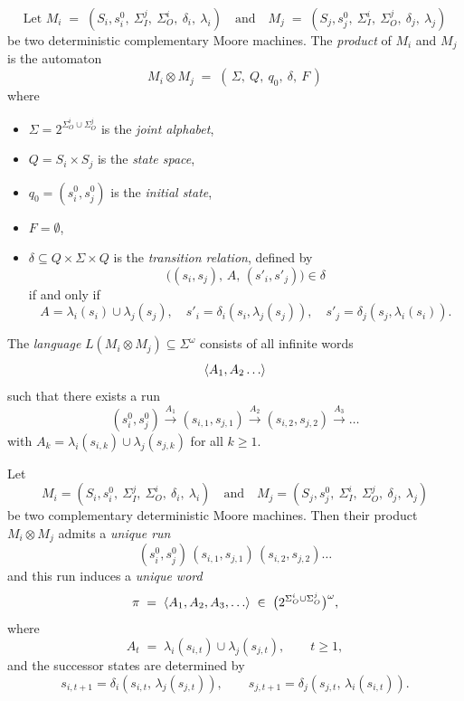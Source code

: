   
  \begin{definition}
  
  \[\text{Let }
  M_i \;=\; (S_i, s^0_i,\ \Sigma_I^j,\ \Sigma_O^i,\ \delta_i,\ \lambda_i)
  \quad\text{and}\quad
  M_j \;=\; (S_j, s^0_j,\ \Sigma_I^i,\ \Sigma_O^j,\ \delta_j,\ \lambda_j)
  \]
  be two deterministic complementary Moore machines.
  The \emph{product} of $M_i$ and $M_j$ is the automaton
  \[
  M_i \otimes M_j \;=\; (\,\Sigma,\ Q,\ q_0,\ \delta,\ F\,)
  \]
  where
  \begin{itemize}
      \item $\Sigma = 2^{\Sigma_O^i \cup \Sigma_O^j}$ is the \emph{joint alphabet},
      \item $Q = S_i \times S_j$ is the \emph{state space},
      \item $q_0 = (s^0_i, s^0_j)$ is the \emph{initial state},
      \item $F = \emptyset$,
      \item $\delta \subseteq Q \times \Sigma \times Q$ is the \emph{transition relation}, defined by
      \[
      \big((s_i,s_j),\, A,\, (s'_i,s'_j)\big) \in \delta
      \]
      if and only if
      \[
      A = \lambda_i(s_i) \cup \lambda_j(s_j), 
      \quad s'_i = \delta_i(s_i,\lambda_j(s_j)), 
      \quad s'_j = \delta_j(s_j,\lambda_i(s_i)).
      \]
  \end{itemize}
  The \emph{language} $L(M_i \otimes M_j) \subseteq \Sigma^\omega$ consists of all infinite words
  \[
  \trace{A_1, A_2 \dots}
  \]
  such that there exists a run
  \[
  (s^0_i, s^0_j) \xrightarrow{A_1} (s_{i,1}, s_{j,1}) \xrightarrow{A_2} (s_{i,2}, s_{j,2}) \xrightarrow{A_3} \dots
  \]
  with $A_k = \lambda_i(s_{i,k}) \cup \lambda_j(s_{j,k})$ for all $k \geq 1$.
  \end{definition}
  
  
  
  \begin{lemma}
  \label{lem:product-word}
  Let
  \[
  M_i = (S_i, s^0_i,\ \Sigma_I^j,\ \Sigma_O^i,\ \delta_i,\ \lambda_i)
  \quad\text{and}\quad
  M_j = (S_j, s^0_j,\ \Sigma_I^i,\ \Sigma_O^j,\ \delta_j,\ \lambda_j)
  \]
  be two complementary deterministic Moore machines.  
  Then their product $M_i \otimes M_j$ admits a \emph{unique run}
  \[
  (s^0_i,s^0_j)\,(s_{i,1},s_{j,1})\,(s_{i,2},s_{j,2})\dots
  \]
  and this run induces a \emph{unique word}
  \[
  \pi \;=\; \langle A_1,A_2,A_3,\dots \rangle  \;\in\; \big(2^{\Sigma_O^i \cup \Sigma_O^j}\big)^\omega,
  \]
  where
  \[
  A_t \;=\; \lambda_i(s_{i,t}) \cup \lambda_j(s_{j,t}), \qquad t \ge 1,
  \]
  and the successor states are determined by
  \[
  s_{i,t+1} = \delta_i(s_{i,t},\,\lambda_j(s_{j,t})),\qquad
  s_{j,t+1} = \delta_j(s_{j,t},\,\lambda_i(s_{i,t})).
  \]
  \end{lemma}
  
